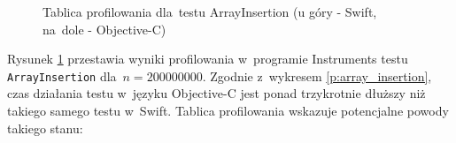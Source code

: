 \documentclass[mgr, shortabstract]{iithesis}
\begin{document}
\begin{figure}
    \caption{Tablica profilowania dla~testu ArrayInsertion (u góry - Swift, na~dole - Objective-C)}
    \label{i:array_insertion}
\end{figure}

Rysunek \ref{i:array_insertion} przestawia wyniki profilowania w~programie Instruments testu \texttt{ArrayInsertion} dla~$n = 200000000$. Zgodnie z~wykresem \ref{p:array_insertion}, czas działania testu w~języku Objective-C jest ponad trzykrotnie dłuższy niż takiego samego testu w~Swift. Tablica profilowania wskazuje potencjalne powody takiego stanu:
\end{document}
